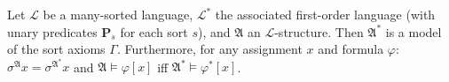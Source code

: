 Let $\mathcal{L}$ be a many-sorted language, $\mathcal{L}^*$ the associated first-order language (with unary predicates $\mathbf{P}_s$ for each sort $s$), and $\mathfrak{A}$ an $\mathcal{L}$-structure. Then $\mathfrak{A}^*$ is a model of the sort axioms $\Gamma$. Furthermore, for any assignment $x$ and formula $\varphi$: $\sigma^{\mathfrak{A}}x = \sigma^{\mathfrak{A}^*}x$ and $\mathfrak{A} \models \varphi[x]$ iff $\mathfrak{A}^* \models \varphi^*[x]$.
